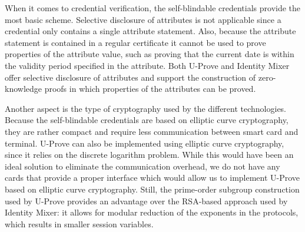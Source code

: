 When it comes to credential verification, the self-blindable credentials provide
the most basic scheme. Selective disclosure of attributes is not applicable
since a credential only contains a single attribute statement. Also, because the
attribute statement is contained in a regular certificate it cannot be used to
prove properties of the attribute value, such as proving that the current date
is within the validity period specified in the attribute. Both U-Prove and Identity Mixer offer
selective disclosure of attributes and support the construction of
zero-knowledge proofs in which properties of the attributes can be proved.

Another aspect is the type of cryptography used by the different technologies.
Because the self-blindable credentials are based on elliptic curve cryptography,
they are rather compact and require less communication between smart card and
terminal. U-Prove can also be implemented using elliptic curve cryptography,
since it relies on the discrete logarithm problem. While this would have been
an ideal solution to eliminate the communication overhead, we do not have any
cards that provide a proper interface which would allow us to implement U-Prove
based on elliptic curve cryptography. Still, the prime-order subgroup
construction used by U-Prove provides an advantage over the RSA-based approach
used by Identity Mixer: it allows for modular reduction 
of the exponents in the protocols, which results in smaller session variables.

